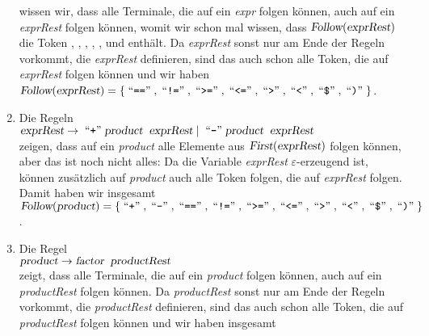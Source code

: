 \begin{enumerate}
      wissen wir, dass alle Terminale, die auf ein \textsl{expr} folgen k\"onnen, auch auf
      ein \textsl{exprRest} folgen k\"onnen, womit wir schon mal wissen, dass
      $\textsl{Follow}(\textsl{exprRest})$ die Token \qote{==}, \qote{!=}, \qote{<=}, \qote{>=}, \qote{<},   und \qote{)}
      enth\"alt.   Da \textsl{exprRest} sonst nur am Ende der Regeln vorkommt, die
      \textsl{exprRest} definieren, sind das auch schon alle Token, die auf
      \textsl{exprRest} folgen k\"onnen und wir haben
      \\[0.2cm]
      \hspace*{1.3cm}
      $\textsl{Follow}(\textsl{exprRest}) = 
       \{ \quoted{==}, \quoted{!=}, \quoted{>=}, \quoted{<=}, \quoted{>}, \quoted{<}, \quoted{\symbol{36}}, \quoted{)} \}$.
\item Die Regeln 
      \\[0.2cm]
      \hspace*{1.3cm}
      $\textsl{exprRest} \rightarrow \;\mbox{``\texttt{+}''}\; \textsl{product}\;\;\textsl{exprRest} 
                         \mid        \;\mbox{``\texttt{-}''}\; \textsl{product}\;\;\textsl{exprRest}$
      \\[0.2cm]
      zeigen, dass auf ein \textsl{product} alle Elemente aus $\textsl{First}(\textsl{exprRest})$
      folgen k\"onnen, aber das ist noch nicht alles:  Da die Variable \textsl{exprRest}
      $\varepsilon$-erzeugend ist, k\"onnen zus\"atzlich auf \textsl{product} auch
      alle Token folgen, die auf \textsl{exprRest} folgen.  Damit haben wir insgesamt
      \\[0.2cm]
      \hspace*{1.3cm}
      $\textsl{Follow}(\textsl{product}) = 
      \{ \quoted{+}, \quoted{-},  \quoted{==}, \quoted{!=}, \quoted{>=}, \quoted{<=}, \quoted{>}, \quoted{<}, \quoted{\symbol{36}}, \quoted{)} \}$.
\item Die Regel
      \\[0.2cm]
      \hspace*{1.3cm}
      $\textsl{product} \rightarrow \textsl{factor}\;\;\textsl{productRest}$
      \\[0.2cm]      
      zeigt, dass alle Terminale, die auf ein \textsl{product} folgen k\"onnen, auch auf
      ein \textsl{productRest} folgen k\"onnen.
      Da \textsl{productRest} sonst nur am Ende der Regeln vorkommt, die
      \textsl{productRest} definieren, sind das auch schon alle Token, die auf
      \textsl{productRest} folgen k\"onnen und wir haben insgesamt
      \\[0.2cm]

\end{enumerate}
